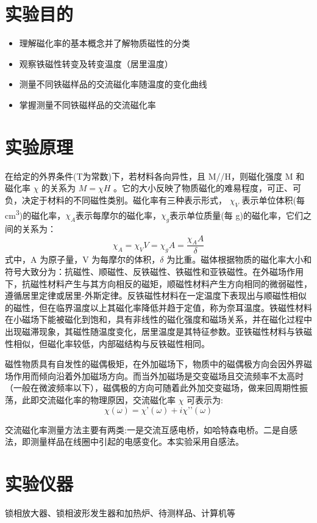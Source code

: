 \documentclass[a4paper,utf8]{article}
\begin{document}
\section{实验目的}
    \begin{itemize}
        \item 理解磁化率的基本概念并了解物质磁性的分类 
        \item 观察铁磁性转变及转变温度（居里温度）
        \item 测量不同铁磁样品的交流磁化率随温度的变化曲线
        \item 掌握测量不同铁磁样品的交流磁化率
    \end{itemize}
\section{实验原理}
    在给定的外界条件(T为常数)下，若材料各向异性，且 M//H，则磁化强度 M 和磁化率 $\chi$ 的关系为 $M=\chi H$ 。它的大小反映了物质磁化的难易程度，可正、可负，决定于材料的不同磁性类别。磁化率有三种表示形式， $\chi_V$ 表示单位体积(每 \unit{\cm^3})的磁化率，$\chi_A$表示每摩尔的磁化率，$\chi_g$表示单位质量(每 g)的磁化率，它们之间的关系为：
    \begin{equation}
        \chi_{A}=\chi_{V}V=\chi_{g}A=\frac{\chi_{A}A}{\delta}
    \end{equation}
    式中，A 为原子量，V 为每摩尔的体积，$\delta$ 为比重。磁体根据物质的磁化率大小和符号大致分为：抗磁性、顺磁性、反铁磁性、铁磁性和亚铁磁性。在外磁场作用下，抗磁性材料产生与其方向相反的磁矩，顺磁性材料产生方向相同的微弱磁性，遵循居里定律或居里-外斯定律。反铁磁性材料在一定温度下表现出与顺磁性相似的磁性，但在临界温度以上其磁化率降低并趋于定值，称为奈耳温度。铁磁性材料在小磁场下能被磁化到饱和，具有非线性的磁化强度和磁场关系，并在磁化过程中出现磁滞现象，其磁性随温度变化，居里温度是其特征参数。亚铁磁性材料与铁磁性相似，但磁化率较低，内部磁结构与反铁磁性相同。\par
    磁性物质具有自发性的磁偶极矩，在外加磁场下，物质中的磁偶极方向会因外界磁场作用而倾向沿着外加磁场方向。而当外加磁场是交变磁场且交流频率不太高时（一般在微波频率以下），磁偶极的方向可随着此外加交变磁场，做来回周期性振荡，此即交流磁化率的物理原因，交流磁化率 $\chi$ 可表示为:
    \begin{equation}
        \chi(\omega)=\chi’(\omega)+i\chi’’(\omega)
    \end{equation}\par
    交流磁化率测量方法主要有两类:一是交流互感电桥，如哈特森电桥。二是自感法，即测量样品在线圈中引起的电感变化。本实验采用自感法。
\section{实验仪器}
    锁相放大器、锁相波形发生器和加热炉、待测样品、计算机等
\end{document}
